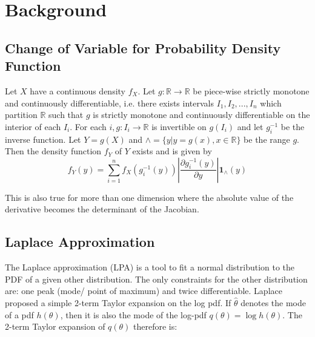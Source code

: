 \section{Background}
\label{sec:background}

\subsection{Change of Variable for Probability Density Function}
\label{subsec:variable_change_pdf}


Let $X$ have a continuous density $f_X$. Let $g: \mathbb{R} \rightarrow \mathbb{R}$ be piece-wise strictly monotone and continuously differentiable, i.e. there exists intervals $I_1,I_2, ..., I_n$ which partition $\mathbb{R}$ such that $g$ is strictly monotone and continuously differentiable on the interior of each $I_i$. For each $i, g:I_i \rightarrow \mathbb{R}$ is invertible on $g(I_i)$ and let $g_i^{-1}$ be the inverse function. Let $Y = g(X)$ and $\wedge = \{y| y=g(x), x \in \mathbb{R}\}$ be the range $g$. Then the density function $f_Y$ of $Y$ exists and is given by 
\begin{equation}
\label{eq:1D_variable_transform}
f_Y(y) = \sum_{i=1}^{n} f_X(g_i^{-1}(y)) \left\vert\frac{\partial g_i^{-1}(y)}{\partial y} \right\vert \mathbf{1}_\wedge(y) 
\end{equation}

This is also true for more than one dimension where the absolute value of the derivative becomes the determinant of the Jacobian. 

\subsection{Laplace Approximation}

The Laplace approximation (LPA) is a tool to fit a normal distribution to the PDF of a given other distribution. The only constraints for the other distribution are: one peak (mode/ point of maximum) and twice differentiable. Laplace proposed a simple 2-term Taylor expansion on the log pdf. If $\hat{\theta}$ denotes the mode of a pdf $h(\theta)$, then it is also the mode of the log-pdf $q(\theta) = \log h(\theta)$. The 2-term Taylor expansion of $q(\theta)$ therefore is:

